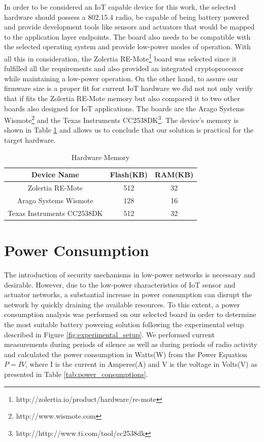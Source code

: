 In order to be considered an \gls{IoT} capable device for this work, the selected hardware should possess a 802.15.4 radio, be capable of being battery powered and provide development tools like sensors and actuators that would be mapped to the application layer endpoints. 
The board also needs to be compatible with the selected operating system and provide low-power modes of operation. 
With all this in consideration, the Zolertia RE-Mote\footnote{http://zolertia.io/product/hardware/re-mote} board was selected since it fulfilled all the requirements and also provided an integrated cryptoprocessor while maintaining a low-power operation.
On the other hand, to assure our firmware size is a proper fit for current \gls{IoT} hardware we did not not only verify that if fits the Zolertia RE-Mote memory but also compared it to two other boards also designed for \gls{IoT} applications. 
The boards are the Arago Systems Wismote\footnote{http://www.wismote.com} and the Texas Instruments CC2538DK\footnote{http://http://www.ti.com/tool/cc2538dk}. 
The device's memory is shown in Table \ref{tab:hardware_memory} and allows us to conclude that our solution is practical for the target hardware.

\begin{table}
\centering
\caption{Hardware Memory}
\label{tab:hardware_memory}
\begin{tabular}{|c|c|c|} \hline
Device Name&Flash(KB)&RAM(KB)\\ \hline
Zolertia RE-Mote& 512& 32\\ \hline
Arago Systems Wismote& 128& 16\\ \hline
Texas Instruments CC2538DK& 512 & 32\\
\hline\end{tabular}
\end{table}

\section{Power Consumption}
The introduction of security mechanisms in low-power networks is necessary and desirable. However, due to the low-power characteristics of \gls{IoT} sensor and actuator networks, a substantial increase in power consumption can disrupt the network by quickly draining the available resources. 
To this extent, a power consumption analysis was performed on our selected board in order to determine the most suitable battery powering solution following the experimental setup described in Figure \ref{fig:experimental_setup}. 
We performed current measurements during periods of silence as well as during periods of radio activity and calculated the power consumption in Watts(W) from the Power Equation $P = I  V$, where I is the current in Amperes(A) and V is the voltage in Volts(V) as presented in Table \ref{tab:power_consumptions}.


